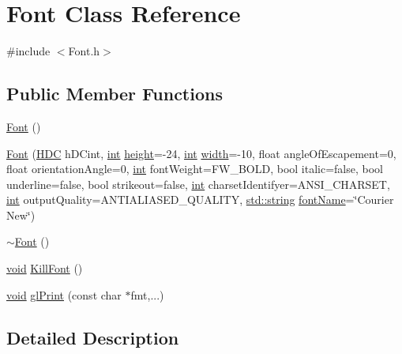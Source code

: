 \hypertarget{class_font}{\section{Font Class Reference}
\label{class_font}
}


{\ttfamily \#include $<$Font.\+h$>$}

\subsection*{Public Member Functions}
\begin{DoxyCompactItemize}
\item 
\hyperlink{class_font_a4e6a119206f505522100221c1fafde45}{Font} ()
\item 
\hyperlink{class_font_affe779785f1d6e69d4c4e46996201d7d}{Font} (\hyperlink{wglext_8h_aaf5a06bd464c6ec72cf68b4819afebe3}{H\+D\+C} h\+D\+Cint, \hyperlink{wglext_8h_a500a82aecba06f4550f6849b8099ca21}{int} \hyperlink{glext_8h_aa214bd63e12f7ddf524c83894fcc69a7}{height}=-\/24, \hyperlink{wglext_8h_a500a82aecba06f4550f6849b8099ca21}{int} \hyperlink{glext_8h_aa105b18f96e6bc2485cb7f576a7fb9ba}{width}=-\/10, float angle\+Of\+Escapement=0, float orientation\+Angle=0, \hyperlink{wglext_8h_a500a82aecba06f4550f6849b8099ca21}{int} font\+Weight=F\+W\+\_\+\+B\+O\+L\+D, bool italic=false, bool underline=false, bool strikeout=false, \hyperlink{wglext_8h_a500a82aecba06f4550f6849b8099ca21}{int} charset\+Identifyer=A\+N\+S\+I\+\_\+\+C\+H\+A\+R\+S\+E\+T, \hyperlink{wglext_8h_a500a82aecba06f4550f6849b8099ca21}{int} output\+Quality=A\+N\+T\+I\+A\+L\+I\+A\+S\+E\+D\+\_\+\+Q\+U\+A\+L\+I\+T\+Y, \hyperlink{glext_8h_ae84541b4f3d8e1ea24ec0f466a8c568b}{std\+::string} \hyperlink{glext_8h_ab669695d2be97b71fa1439607bfb92a6}{font\+Name}=\char`\"{}Courier New\char`\"{})
\item 
\hyperlink{class_font_a134aaa2f78af0c12d3ce504957169768}{$\sim$\+Font} ()
\item 
\hyperlink{wglext_8h_a9e6b7f1933461ef318bb000d6bd13b83}{void} \hyperlink{class_font_af5da83acec19907e2481da2126e077bc}{Kill\+Font} ()
\item 
\hyperlink{wglext_8h_a9e6b7f1933461ef318bb000d6bd13b83}{void} \hyperlink{class_font_abc5d95a4605278837b3f6697f6499dc1}{gl\+Print} (const char $\ast$fmt,...)
\end{DoxyCompactItemize}


\subsection{Detailed Description}


